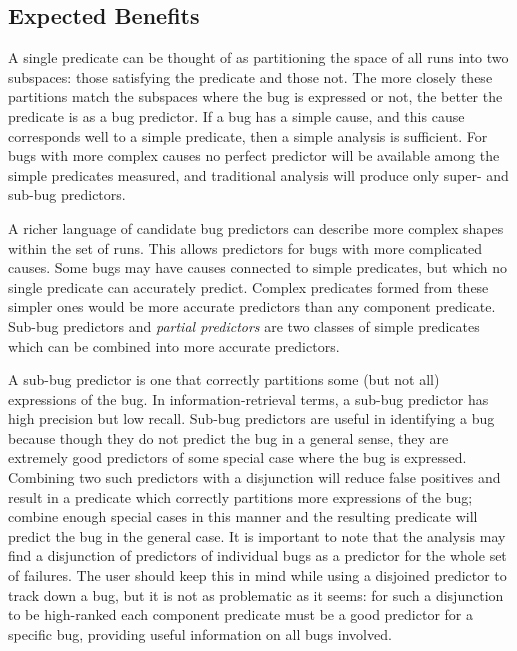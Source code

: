 \subsection{Expected Benefits}
A single predicate can be thought of as partitioning the space of all runs into two subspaces: those satisfying the predicate and those not.  The more closely these partitions match the subspaces where the bug is expressed or not, the better the predicate is as a bug predictor.  If a bug has a simple cause, and this cause corresponds well to a simple predicate, then a simple analysis is sufficient.  For bugs with more complex causes no perfect predictor will be available among the simple predicates measured, and traditional analysis will produce only super- and sub-bug predictors.

A richer language of candidate bug predictors can describe more complex shapes within the set of runs.  This allows predictors for bugs with more complicated causes.  Some bugs may have causes connected to simple predicates, but which no single predicate can accurately predict.  Complex predicates formed from these simpler ones would be more accurate predictors than any component predicate.  Sub-bug predictors and \emph{partial predictors} are two classes of simple predicates which can be combined into more accurate predictors.

A sub-bug predictor is one that correctly partitions some (but not all) expressions of the bug.  In information-retrieval terms, a sub-bug predictor has high precision but low recall.  Sub-bug predictors are useful in identifying a bug because though they do not predict the bug in a general sense, they are extremely good predictors of some special case where the bug is expressed.  Combining two such predictors with a disjunction will reduce false positives and result in a predicate which correctly partitions more expressions of the bug; combine enough special cases in this manner and the resulting predicate will predict the bug in the general case.  It is important to note that the analysis may find a disjunction of predictors of individual bugs as a predictor for the whole set of failures.  The user should keep this in mind while using a disjoined predictor to track down a bug, but it is not as problematic as it seems: for such a disjunction to be high-ranked each component predicate must be a good predictor for a specific bug, providing useful information on all bugs involved.

